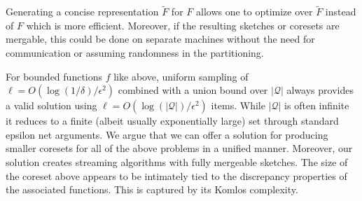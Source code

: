 \documentclass[anon,12pt]{colt2019} %
\newcommand{\eps}{\epsilon}
\begin{document}
Generating a concise representation $\tilde F$ for $F$ allows one to optimize over $\tilde F$ instead of $F$ which is more efficient.  Moreover, if the resulting sketches or coresets are mergable, this could be done on separate machines without the need for communication or assuming randomness in the partitioning.


For bounded functions $f$ like above, uniform sampling of $\ell = O(\log(1/\delta)/\eps^2)$ combined with a union bound over $|\mathcal Q|$ always provides a valid solution using $\ell = O(\log(|\mathcal Q|)/\eps^2)$ items. 
While $|\mathcal Q|$ is often infinite it reduces to a finite (albeit usually exponentially large) set through standard epsilon net arguments. 
%
We argue that we can offer a solution for producing smaller coresets for all of the above problems in a unified manner. 
Moreover, our solution creates streaming algorithms with fully mergeable sketches. 
The size of the coreset above appears to be intimately tied to the discrepancy properties of the associated functions.
This is captured by its Komlos complexity.  
\end{document}
